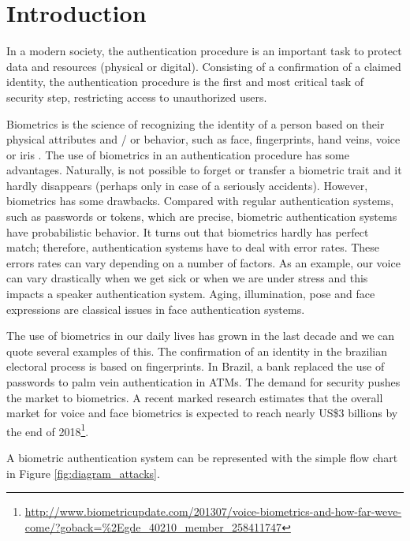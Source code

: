 \chapter{Introduction}
\label{chap:introduction}

In a modern society, the authentication procedure is an important task to protect data and resources (physical or digital). Consisting of a confirmation of a claimed identity, the authentication procedure is the first and most critical task of security step, restricting access to unauthorized users. 

Biometrics is the science of recognizing the identity of a person based on their physical attributes and / or behavior, such as face, fingerprints, hand veins, voice or iris \cite{li2011handbook}. The use of biometrics in an authentication procedure has some advantages. Naturally, is not possible to forget or transfer a biometric trait and it hardly disappears (perhaps only in case of a seriously accidents). However, biometrics has some drawbacks. Compared with regular authentication systems, such as passwords or tokens, which are precise, biometric authentication systems have probabilistic behavior. It turns out that biometrics hardly has perfect match; therefore, authentication systems have to deal with error rates. These errors rates can vary depending on a number of factors. As an example, our voice can vary drastically  when we get sick or when we are under stress and this impacts a speaker authentication system. Aging, illumination, pose and face expressions are classical issues in face authentication systems.


The use of biometrics in our daily lives has grown in the last decade and we can quote several examples of this. The confirmation of an identity in the brazilian electoral process is based on fingerprints. In Brazil, a bank replaced the use of passwords to palm vein authentication in ATMs. The demand for security pushes the market to biometrics. A recent marked research estimates that the overall market for voice and face biometrics is expected to reach nearly US\$3 billions by the end of 2018\footnote{\url{http://www.biometricupdate.com/201307/voice-biometrics-and-how-far-weve-come/?goback=\%2Egde\_40210\_member\_258411747}}.


A biometric authentication system can be represented with the simple flow chart in Figure \ref{fig:diagram_attacks}.

